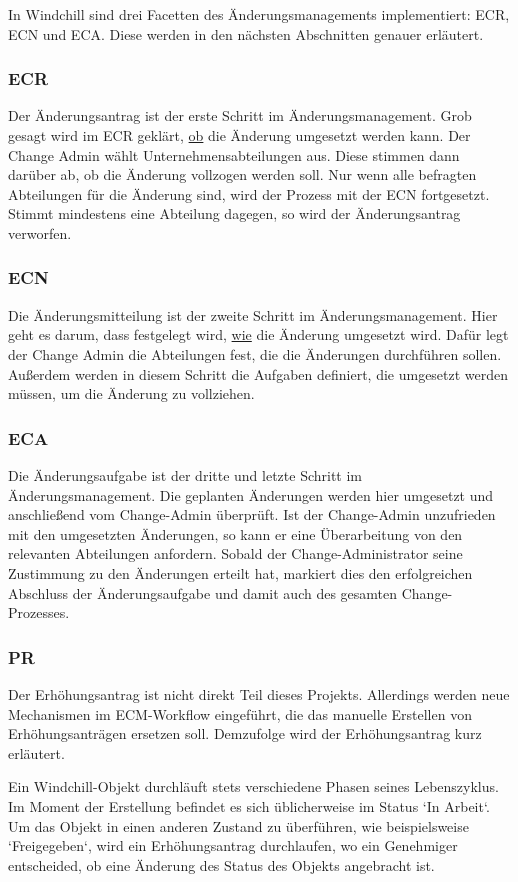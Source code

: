 In Windchill sind drei Facetten des Änderungsmanagements implementiert: \acl{ECR}, \acl{ECN} und \acl{ECA}.
Diese werden in den nächsten Abschnitten genauer erläutert.

\subsubsection{\acl{ECR}}
Der Änderungsantrag ist der erste Schritt im Änderungsmanagement.
Grob gesagt wird im \ac{ECR} geklärt, \underline{ob} die Änderung umgesetzt werden kann.
Der Change Admin wählt Unternehmensabteilungen aus.
Diese stimmen dann darüber ab, ob die Änderung vollzogen werden soll.
Nur wenn alle befragten Abteilungen für die Änderung sind, wird der Prozess mit der \ac{ECN} fortgesetzt.
Stimmt mindestens eine Abteilung dagegen, so wird der Änderungsantrag verworfen.

\subsubsection{\acl{ECN}}
Die Änderungsmitteilung ist der zweite Schritt im Änderungsmanagement.
Hier geht es darum, dass festgelegt wird, \underline{wie} die Änderung umgesetzt wird.
Dafür legt der Change Admin die Abteilungen fest, die die Änderungen durchführen sollen.
Außerdem werden in diesem Schritt die Aufgaben definiert, die umgesetzt werden müssen, um die Änderung zu vollziehen.

\subsubsection{\acl{ECA}}
Die Änderungsaufgabe ist der dritte und letzte Schritt im Änderungsmanagement.
Die geplanten Änderungen werden hier umgesetzt und anschließend vom Change-Admin überprüft.
Ist der Change-Admin unzufrieden mit den umgesetzten Änderungen, so kann er eine Überarbeitung von den relevanten Abteilungen anfordern.
Sobald der Change-Administrator seine Zustimmung zu den Änderungen erteilt hat, markiert dies den erfolgreichen Abschluss der Änderungsaufgabe und damit auch des gesamten Change-Prozesses.

\subsubsection{\acl{PR}}
Der Erhöhungsantrag ist nicht direkt Teil dieses Projekts.
Allerdings werden neue Mechanismen im \ac{ECM}-Workflow eingeführt, die das manuelle Erstellen von Erhöhungsanträgen ersetzen soll.
Demzufolge wird der Erhöhungsantrag kurz erläutert.

Ein Windchill-Objekt durchläuft stets verschiedene Phasen seines Lebenszyklus.
Im Moment der Erstellung befindet es sich üblicherweise im Status `In Arbeit`.
Um das Objekt in einen anderen Zustand zu überführen, wie beispielsweise `Freigegeben`, wird ein Erhöhungsantrag durchlaufen, wo ein Genehmiger entscheided, ob eine Änderung des Status des Objekts angebracht ist.